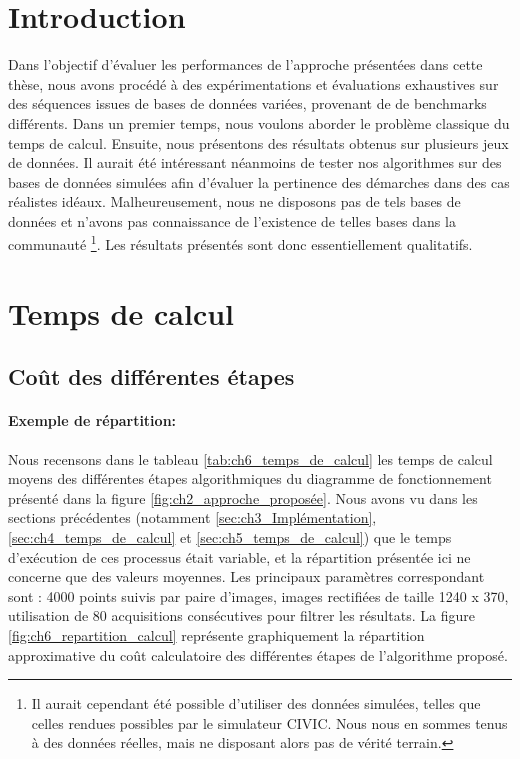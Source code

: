 \vspace{10pt}

\minitoc
\clearpage

\section{Introduction}

Dans l'objectif d'évaluer les performances de l'approche présentées dans cette thèse, nous avons procédé à des expérimentations et évaluations exhaustives sur des séquences issues de bases de données variées, provenant de de benchmarks différents. Dans un premier temps, nous voulons  aborder le problème classique du temps de calcul. Ensuite, nous présentons des résultats obtenus sur plusieurs jeux de données. Il aurait été intéressant néanmoins de tester nos algorithmes sur des bases de données simulées afin d'évaluer la pertinence des démarches dans des cas réalistes idéaux. Malheureusement, nous ne disposons pas de tels bases de données et n'avons pas connaissance de l'existence de telles bases dans la communauté \footnote{Il aurait cependant été possible d'utiliser des données simulées, telles que celles rendues possibles par le simulateur CIVIC. Nous nous en sommes tenus à des données réelles, mais ne disposant alors pas de vérité terrain.}. Les résultats présentés sont donc essentiellement qualitatifs.

\section{Temps de calcul}\label{sec:ch6_temps_reel}
\subsection{Coût des différentes étapes}
\paragraph{Exemple de répartition:\\}
Nous recensons dans le tableau \ref{tab:ch6_temps_de_calcul} les temps de calcul moyens des différentes étapes algorithmiques du diagramme de fonctionnement présenté dans la figure \ref{fig:ch2_approche_proposée}. Nous avons vu dans les sections précédentes (notamment \ref{sec:ch3_Implémentation}, \ref{sec:ch4_temps_de_calcul} et \ref{sec:ch5_temps_de_calcul}) que le temps d'exécution de ces processus était variable, et la répartition présentée ici ne concerne que des valeurs moyennes. Les principaux paramètres correspondant sont : 4000 points suivis par paire d'images, images rectifiées de taille 1240 x 370, utilisation de 80 acquisitions consécutives pour filtrer les résultats.	La figure \ref{fig:ch6_repartition_calcul} représente graphiquement la répartition approximative du coût calculatoire des différentes étapes de l'algorithme proposé. 

